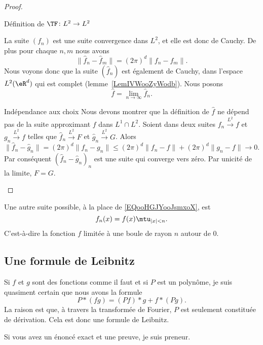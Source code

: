 \begin{proof}
\begin{subproof}
		\item[Définition de \( \TF\colon L^2\to L^2\)]

		La suite \( (f_n)\) est une suite convergence dans \( L^2\), et elle est donc de Cauchy. De plus pour chaque \( n,m\) nous avons
		\begin{equation}
			\| \hat f_n-\hat f_m \|=(2\pi)^d\| f_n-f_m \|.
		\end{equation}
		Nous voyons donc que la suite \( (\hat f_n)\) est également de Cauchy, dans l'espace \( L^2(\eR^d)\) qui est complet (lemme~\ref{LemIVWooZyWodb}). Nous posons
		\begin{equation}
			\hat f=\lim_{n\to \infty} \hat f_n.
		\end{equation}

		\item[Indépendance aux choix]
		Nous devons montrer que la définition de \( \hat f\) ne dépend pas de la suite approximant \( f\) dans \( L^1\cap L^2\). Soient dans deux suites \( f_n\stackrel{L^2}{\longrightarrow}f\) et \( g_n\stackrel{L^2}{\longrightarrow}f\) telles que \( \hat f_n\stackrel{L^2}{\longrightarrow}F\) et \( \hat g_n\stackrel{L^2}{\longrightarrow}G\). Alors
		\begin{equation}
			\| \hat f_n-\hat g_n \|=(2\pi)^d\| f_n-g_n \|\leq (2\pi)^d\| f_n-f \|+(2\pi)^d\| g_n-f \|\to 0.
		\end{equation}
		Par conséquent \( (\hat f_n-\hat g_n)_n\) est une suite qui converge vers zéro. Par unicité de la limite, \( F=G\).
	\end{subproof}
\end{proof}

\begin{remark}
	Une autre suite possible, à la place de \eqref{EQooHGJYooJsmxoX}, est
	\begin{equation}
		f_n(x)=f(x)\mtu_{| x |<n}.
	\end{equation}
	C'est-à-dire la fonction \( f\) limitée à une boule de rayon \( n\) autour de \( 0\).
\end{remark}

\subsection{Une formule de Leibnitz}

\begin{probleme}        \label{PROPooBTXLooFhuYSs}
	Si \( f\) et \( g\) sont des fonctions comme il faut et si \( P\) est un polynôme, je suis quasiment certain que nous avons la formule
	\begin{equation}
		P*(fg)=(Pf)*g+f*(Pg).
	\end{equation}
	La raison est que, à travers la transformée de Fourier, \( P\) est seulement constituée de dérivation. Cela est donc une formule de Leibnitz.

	Si vous avez un énoncé exact et une preuve, je suis preneur.
\end{probleme}
